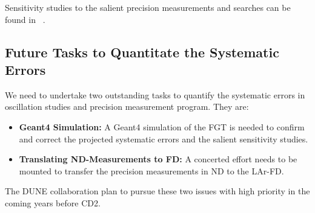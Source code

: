 Sensitivity studies to the salient precision measurements and searches can be found in 
~\cite{LBNE-SCIENCE, DPR}. 


\subsection{Future Tasks to Quantitate the Systematic Errors}
\label{cdrsec:detectors-nd-ref-fgt-req-future} 

We need to undertake two outstanding tasks to quantify the systematic errors in oscillation studies 
and precision measurement program. They are: 

\begin{itemize}
    \item {\bf Geant4 Simulation:} A Geant4 simulation of the FGT is needed to confirm and correct 
    the projected systematic errors and  the salient sensitivity studies. 
    
     \item {\bf Translating ND-Measurements to FD:} A concerted effort needs to be mounted to transfer 
     the precision measurements in ND to the LAr-FD. 
     
\end{itemize}    

The DUNE collaboration plan to pursue these two issues with high priority in the coming years before CD2. 
